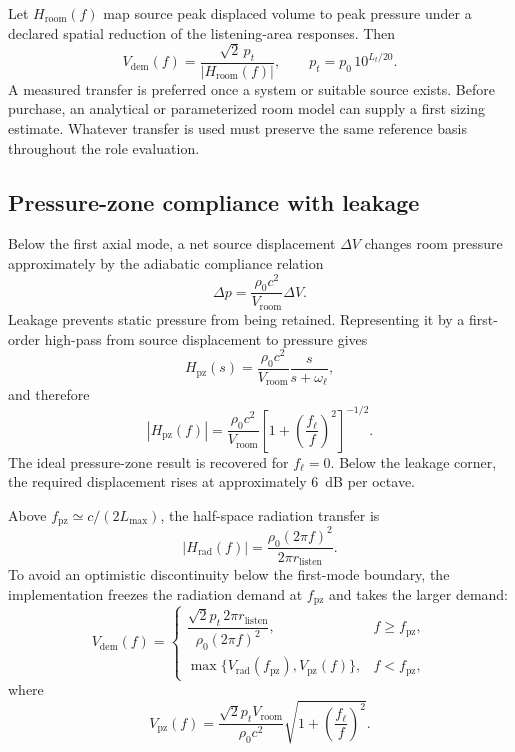 \documentclass[11pt,a4paper]{article}
\numberwithin{equation}{section}
\begin{document}
Let $H_{\mathrm{room}}(f)$ map source peak displaced volume to peak pressure
under a declared spatial reduction of the listening-area responses.  Then
\begin{equation}
	V_{\mathrm{dem}}(f)=
	\frac{\sqrt2\,p_t}{|H_{\mathrm{room}}(f)|},
	\qquad
	p_t=p_0\,10^{L_t/20}.
	\label{eq:demand-general}
\end{equation}
A measured transfer is preferred once a system or suitable source exists.
Before purchase, an analytical or parameterized room model can supply a
first sizing estimate.  Whatever transfer is used must preserve the same
reference basis throughout the role evaluation.

\subsection{Pressure-zone compliance with leakage}
\label{sec:room-pz}

Below the first axial mode, a net source displacement $\Delta V$ changes
room pressure approximately by the adiabatic compliance relation
\begin{equation}
	\Delta p=\frac{\rho_0c^2}{V_{\mathrm{room}}}\Delta V.
	\label{eq:room-compliance}
\end{equation}
Leakage prevents static pressure from being retained.  Representing it by a
first-order high-pass from source displacement to pressure gives
\begin{equation}
	H_{\mathrm{pz}}(s)=
	\frac{\rho_0c^2}{V_{\mathrm{room}}}
	\frac{s}{s+\omega_\ell},
	\label{eq:Hpz}
\end{equation}
and therefore
\begin{equation}
	|H_{\mathrm{pz}}(f)|=
	\frac{\rho_0c^2}{V_{\mathrm{room}}}
	\left[1+\left(\frac{f_\ell}{f}\right)^2\right]^{-1/2}.
	\label{eq:pzdyn}
\end{equation}
The ideal pressure-zone result is recovered for $f_\ell=0$.  Below the
leakage corner, the required displacement rises at approximately
\SI{6}{dB} per octave.

Above
$f_{\mathrm{pz}}\simeq c/(2L_{\max})$, the half-space radiation transfer is
\begin{equation}
	|H_{\mathrm{rad}}(f)|=
	\frac{\rho_0(2\pi f)^2}{2\pi r_{\mathrm{listen}}}.
	\label{eq:Hrad}
\end{equation}
To avoid an optimistic discontinuity below the first-mode boundary, the
implementation freezes the radiation demand at $f_{\mathrm{pz}}$ and takes
the larger demand:
\begin{equation}
	V_{\mathrm{dem}}(f)=
	\begin{cases}
	\dfrac{\sqrt2 p_t\,2\pi r_{\mathrm{listen}}}
	{\rho_0(2\pi f)^2},
	& f\ge f_{\mathrm{pz}},\\[2.2ex]
	\max\{V_{\mathrm{rad}}(f_{\mathrm{pz}}),V_{\mathrm{pz}}(f)\},
	& f<f_{\mathrm{pz}},
	\end{cases}
	\label{eq:Vdem}
\end{equation}
where
\begin{equation}
	V_{\mathrm{pz}}(f)=
	\frac{\sqrt2p_tV_{\mathrm{room}}}{\rho_0c^2}
	\sqrt{1+\left(\frac{f_\ell}{f}\right)^2}.
	\label{eq:Vpz}
\end{equation}
\end{document}
